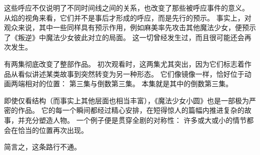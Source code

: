 这些呼应不仅说明了不同时间线之间的关系，也改变了那些被呼应事件的意义。
从焰的视角来看，它们并不是事后才形成的呼应，而是先行的预示。
事实上，对观众来说，其中一些同样具有预示作用，例如麻美率先攻击其他魔法少女，便预示了《叛逆》中魔法少女彼此对立的局面。
这一切曾经发生过，而且很可能还会再次发生。

有两集彻底改变了整部作品。
初次观看时，这两集尤其突出，因为它们标志着作品从看似讲述某类故事到突然转变为另一种形态。
它们像镜像一样，恰好位于动画两端相对的位置：
第三集与倒数第三集。
本集就是其中的倒数第三集。

即使仅看结构（而事实上其他层面也相当丰富），《魔法少女小圆》也是一部极为严密的作品。
它的每一个瞬间都经过精心安排，在短得惊人的篇幅内推进复杂的故事，并充分塑造人物。
一个例子便是贯穿全剧的对称性：
许多或大或小的情节都会在恰当的位置再次出现。

简言之，这条路行不通。
